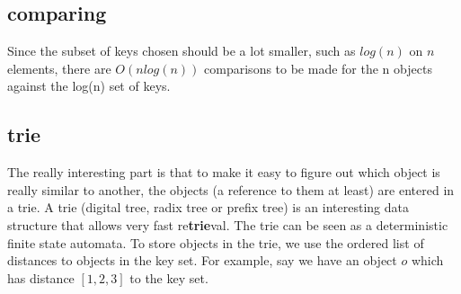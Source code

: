 \documentclass[a4paper, 12pt] {article}
\begin{document}
\subsection*{comparing}
Since the subset of keys chosen should be a lot smaller, such as $log(n)$ on $n$ elements, there are $O(nlog(n))$ comparisons to be made 
for the n objects against the log(n) set of keys.
\subsection*{trie}
The really interesting part is that to make it easy to figure out which object is really similar to another, the objects (a reference to them at least)
are entered in a trie. A trie (digital tree, radix tree or prefix tree) is an interesting data structure that allows very fast re{\bf{trie}}val. The trie can
be seen as a deterministic finite state automata. To store objects in the trie, we use the ordered list of distances to objects in the key set. 
For example, say we have an object $o$ which has distance $[1,2,3]$ to the key set.
\end{document}
